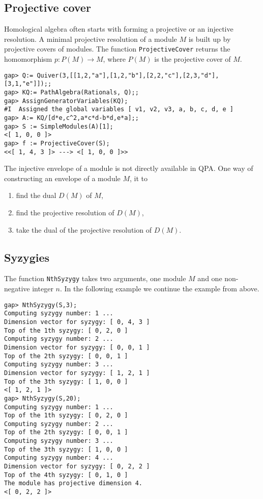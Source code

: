 \documentclass{amsart}
\theoremstyle{definition}
\newcommand{\code}[1]{\texttt{#1}}
\theoremstyle{theoretic}
\begin{document}
\subsection{Projective cover}
Homological algebra often starts with forming a projective or an
injective resolution.  A minimal projective resolution of a module $M$
is built up by projective covers of modules.  The function
\code{ProjectiveCover} returns the homomorphism $p\colon P(M)\to M$,
where $P(M)$ is the projective cover of $M$.  

\begin{verbatim}
gap> Q:= Quiver(3,[[1,2,"a"],[1,2,"b"],[2,2,"c"],[2,3,"d"],
[3,1,"e"]]);;
gap> KQ:= PathAlgebra(Rationals, Q);;
gap> AssignGeneratorVariables(KQ);
#I  Assigned the global variables [ v1, v2, v3, a, b, c, d, e ]
gap> A:= KQ/[d*e,c^2,a*c*d-b*d,e*a];;
gap> S := SimpleModules(A)[1];
<[ 1, 0, 0 ]>
gap> f := ProjectiveCover(S);
<<[ 1, 4, 3 ]> ---> <[ 1, 0, 0 ]>>
\end{verbatim}
The injective envelope of a module is not directly available in QPA.
One way of constructing an envelope of a module $M$, it to 
\begin{enumerate}[\rm(1)]
\item find the dual $D(M)$ of $M$,
\item find the projective resolution of $D(M)$, 
\item take the dual of the projective resolution of $D(M)$. 
\end{enumerate}

\subsection{Syzygies}
The function \code{NthSyzygy} takes two arguments, one module $M$ and
one non-negative integer $n$.  In the following example we continue
the example from above. 
\begin{verbatim}
gap> NthSyzygy(S,3);
Computing syzygy number: 1 ...
Dimension vector for syzygy: [ 0, 4, 3 ]
Top of the 1th syzygy: [ 0, 2, 0 ]
Computing syzygy number: 2 ...
Dimension vector for syzygy: [ 0, 0, 1 ]
Top of the 2th syzygy: [ 0, 0, 1 ]
Computing syzygy number: 3 ...
Dimension vector for syzygy: [ 1, 2, 1 ]
Top of the 3th syzygy: [ 1, 0, 0 ]
<[ 1, 2, 1 ]>
gap> NthSyzygy(S,20);
Computing syzygy number: 1 ...
Top of the 1th syzygy: [ 0, 2, 0 ]
Computing syzygy number: 2 ...
Top of the 2th syzygy: [ 0, 0, 1 ]
Computing syzygy number: 3 ...
Top of the 3th syzygy: [ 1, 0, 0 ]
Computing syzygy number: 4 ...
Dimension vector for syzygy: [ 0, 2, 2 ]
Top of the 4th syzygy: [ 0, 1, 0 ]
The module has projective dimension 4.
<[ 0, 2, 2 ]>
\end{verbatim}
\end{document}
